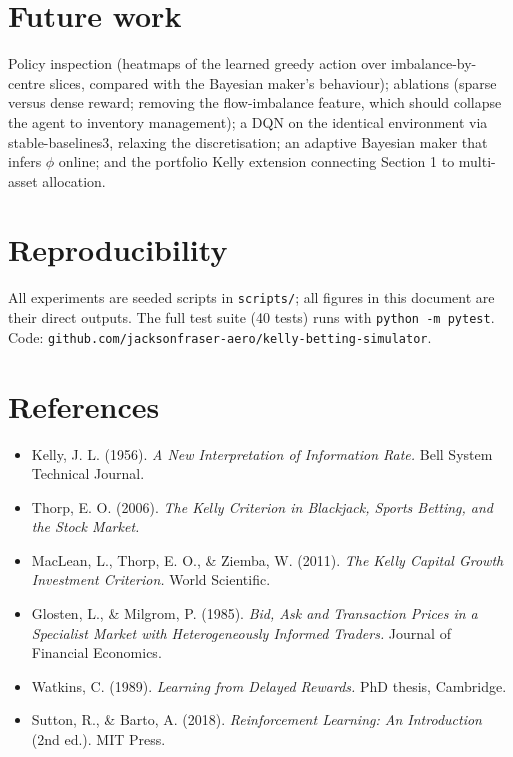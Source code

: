 \documentclass[
  letterpaper,
  DIV=11,
  numbers=noendperiod]{scrartcl}
\providecommand{\tightlist}{%
  \setlength{\itemsep}{0pt}\setlength{\parskip}{0pt}}
\begin{document}
\section{Future work}\label{future-work}

Policy inspection (heatmaps of the learned greedy action over
imbalance-by-centre slices, compared with the Bayesian maker's
behaviour); ablations (sparse versus dense reward; removing the
flow-imbalance feature, which should collapse the agent to inventory
management); a DQN on the identical environment via stable-baselines3,
relaxing the discretisation; an adaptive Bayesian maker that infers
\(\phi\) online; and the portfolio Kelly extension connecting Section 1
to multi-asset allocation.

\section{Reproducibility}\label{reproducibility}

All experiments are seeded scripts in \texttt{scripts/}; all figures in
this document are their direct outputs. The full test suite (40 tests)
runs with \texttt{python\ -m\ pytest}. Code:
\texttt{github.com/jacksonfraser-aero/kelly-betting-simulator}.

\section*{References}\label{references}

\begin{itemize}
\tightlist
\item
  Kelly, J. L. (1956). \emph{A New Interpretation of Information Rate.}
  Bell System Technical Journal.
\item
  Thorp, E. O. (2006). \emph{The Kelly Criterion in Blackjack, Sports
  Betting, and the Stock Market.}
\item
  MacLean, L., Thorp, E. O., \& Ziemba, W. (2011). \emph{The Kelly
  Capital Growth Investment Criterion.} World Scientific.
\item
  Glosten, L., \& Milgrom, P. (1985). \emph{Bid, Ask and Transaction
  Prices in a Specialist Market with Heterogeneously Informed Traders.}
  Journal of Financial Economics.
\item
  Watkins, C. (1989). \emph{Learning from Delayed Rewards.} PhD thesis,
  Cambridge.
\item
  Sutton, R., \& Barto, A. (2018). \emph{Reinforcement Learning: An
  Introduction} (2nd ed.). MIT Press.
\end{itemize}
\end{document}
